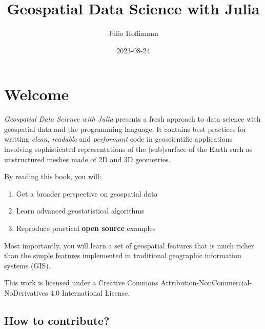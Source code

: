 \documentclass[
  letterpaper,
  DIV=11,
  numbers=noendperiod]{scrreprt}
\title{Geospatial Data Science with Julia}
\author{Júlio Hoffimann}
\date{2023-08-24}
\providecommand{\tightlist}{%
  \setlength{\itemsep}{0pt}\setlength{\parskip}{0pt}}\usepackage{longtable,booktabs,array}
\renewcommand*\contentsname{Table of contents}
\newcommand\contentsname{Table of contents}
\begin{document}
\maketitle
\ifdefined\Shaded\renewenvironment{Shaded}{\begin{tcolorbox}[borderline west={3pt}{0pt}{shadecolor}, enhanced, frame hidden, interior hidden, breakable, sharp corners, boxrule=0pt]}{\end{tcolorbox}}\fi

\renewcommand*\contentsname{Table of contents}
{
\hypersetup{linkcolor=}
\setcounter{tocdepth}{2}
\tableofcontents
}

\hypertarget{welcome}{%
\chapter*{Welcome}\label{welcome}}


\emph{Geospatial Data Science with Julia} presents a fresh approach to
data science with geospatial data and the
\href{https://julialang.org}{}
programming language. It contains best practices for writting
\emph{clean}, \emph{readable} and \emph{performant} code in
geoscientific applications involving sophisticated representations of
the (sub)surface of the Earth such as unstructured meshes made of 2D and
3D geometries.

By reading this book, you will:

\begin{enumerate}
\def\labelenumi{\arabic{enumi}.}
\tightlist
\item
  Get a broader perspective on geospatial data
\item
  Learn advanced geostatistical algorithms
\item
  Reproduce practical \textbf{open source} examples
\end{enumerate}

Most importantly, you will learn a set of geospatial features that is
much richer than the
\href{https://en.wikipedia.org/wiki/Simple_Features}{simple features}
implemented in traditional geographic information systems (GIS).

This work is licensed under a Creative Commons
Attribution-NonCommercial-NoDerivatives 4.0 International License.

\hypertarget{how-to-contribute}{%
\section*{How to contribute?}\label{how-to-contribute}}
\end{document}

